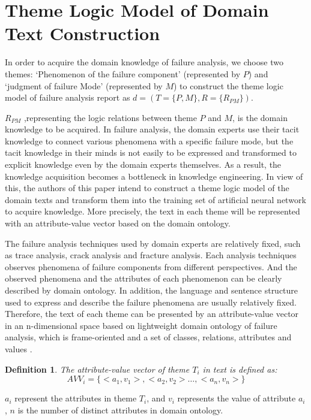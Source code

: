 \documentclass{elsart}
\newtheorem{definition}{Definition}
\begin{document}
\section{Theme Logic Model of Domain Text Construction}
\label{sec:theme-logic-model}

In order to acquire the domain knowledge of failure analysis, we
choose two themes: ‘Phenomenon of the failure component’ (represented
by $P$) and ‘judgment of failure Mode’ (represented by $M$) to construct
the theme logic model of failure analysis report as $d = (T = \{P,M\},
R = \{R_{PM}\})$.

$R_{PM}$ ,representing the logic relations between theme $P$ and $M$, is the domain knowledge to be acquired. In failure analysis, the
domain experts use their tacit knowledge to connect various phenomena
with a specific failure mode, but the tacit knowledge in their minds is
not easily to be expressed and transformed to explicit knowledge even
by the domain experts themselves. As a result, the
knowledge acquisition becomes a bottleneck in knowledge
engineering. In view of this, the authors of this paper intend to construct a theme logic model of the domain
texts and transform them into the training set of artificial neural
network to acquire knowledge. More precisely, the text in each
theme will be represented with an attribute-value vector based on the
domain ontology. 

The failure analysis techniques used by domain experts are relatively
fixed, such as trace analysis, crack analysis and fracture
analysis. Each analysis techniques observes phenomena of failure
components from different perspectives. And the observed phenomena and
the attributes of each phenomenon can be clearly described by domain
ontology. In addition, the language and sentence structure used to express and describe the failure phenomena are usually relatively fixed. Therefore, the text of each theme can be presented by an attribute-value vector in an n-dimensional space based on lightweight domain ontology of failure analysis, which is frame-oriented and a set of classes, relations, attributes and values \cite{747902}.

\begin{definition}
  The attribute-value vector of theme $T_i$ in text is defined as:
\[AVV_i = \{<a_1,v_1>,<a_2,v_2> \ldots,<a_n,v_n>\} \]
\end{definition}
$a_i$ represent the attributes in theme $T_i$, and $v_i$ represents the value of attribute $a_i$ , $n$ is the number of distinct attributes in domain ontology.
\end{document}
